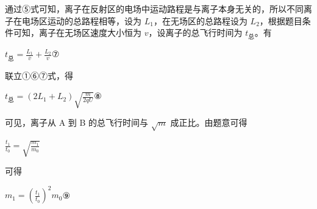 \documentclass[\gkver]{gaokaozhenti}
\begin{document}
\begin{enumerate}
{通过⑤式可知，离子在反射区的电场中运动路程是与离子本身无关的，所以不同离子在电场区运动的总路程相等，设为 $L_{1}$，在无场区的总路程设为 $L_{2}$，根据题目条件可知，离子在无场区速度大小恒为 $v$，设离子的总飞行时间为 $t_{\text{总}}$。有

$t_{\text{总}}=\frac{L_{1}}{\overline{v}}+\frac{L_{2}}{v}$⑦

联立①⑥⑦式，得

$t_{\text{总}}=(2L_{1}+L_{2})\sqrt{\frac{m}{2qU}}$⑧

可见，离子从 A 到 B 的总飞行时间与 $\sqrt{m}$ 成正比。由题意可得

$\frac{t_{1}}{t_{0}}=\sqrt{\frac{m_{1}}{m_{0}}}$

可得

$m_{1}=\left(\frac{t_{1}}{t_{0}}\right)^{2}m_{0}$⑨
}

\end{enumerate}
\end{document}
